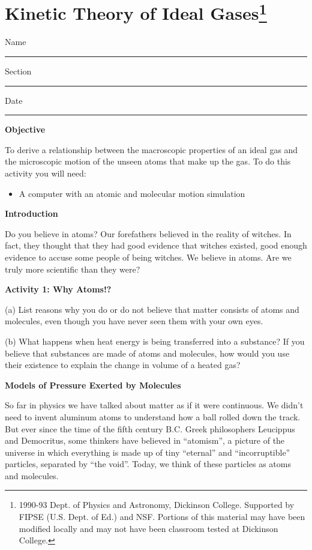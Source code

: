 
\section{Kinetic Theory of Ideal Gases\footnote{%
1990-93 Dept. of Physics and Astronomy, Dickinson College. Supported
by FIPSE (U.S. Dept. of Ed.) and NSF. Portions of this material may
have been modified locally and may not have been classroom tested
at Dickinson College.
}}

Name \rule{2.0in}{0.1pt}\hfill{}Section \rule{1.0in}{0.1pt}\hfill{}Date
\rule{1.0in}{0.1pt}

\textbf{Objective} 

To derive a relationship between the macroscopic properties of an
ideal gas and the microscopic motion of the unseen atoms that make
up the gas. To do this activity you will need:

\begin{itemize}
\item A computer with an atomic and molecular motion simulation
\end{itemize}
\textbf{Introduction}

Do you believe in atoms? Our forefathers believed in the reality of
witches. In fact, they thought that they had good evidence that witches
existed, good enough evidence to accuse some people of being witches.
We believe in atoms. Are we truly more scientific than they were?

\textbf{Activity 1: Why Atoms!?}

(a) List reasons why you do or do not believe that matter consists
of atoms and molecules, even though you have never seen them with
your own eyes.
\vspace{20mm}

(b) What happens when heat energy is being transferred into a substance?
If you believe that substances are made of atoms and molecules, how
would you use their existence to explain the change in volume of a
heated gas?
\vspace{20mm}

\textbf{Models of Pressure Exerted by Molecules}

So far in physics we have talked about matter as if it were continuous.
We didn't need to invent aluminum atoms to understand how a ball rolled
down the track. But ever since the time of the fifth century B.C.
Greek philosophers Leucippus and Democritus, some thinkers have believed
in {}``atomism'', a picture of the universe in which everything
is made up of tiny {}``eternal'' and {}``incorruptible'' particles,
separated by {}``the void''. Today, we think of these particles
as atoms and molecules.

